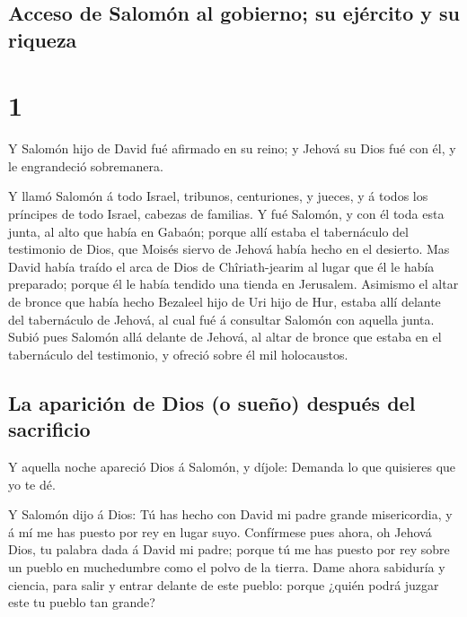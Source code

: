 \hypertarget{acceso-de-salomuxf3n-al-gobierno-su-ejuxe9rcito-y-su-riqueza}{%
\subsection{Acceso de Salomón al gobierno; su ejército y su
riqueza}\label{acceso-de-salomuxf3n-al-gobierno-su-ejuxe9rcito-y-su-riqueza}}

\hypertarget{section}{%
\section{1}\label{section}}

 Y Salomón hijo de David fué afirmado en su reino; y
Jehová su Dios fué con él, y le engrandeció sobremanera.

 Y llamó Salomón á todo Israel, tribunos, centuriones, y
jueces, y á todos los príncipes de todo Israel, cabezas de familias.
 Y fué Salomón, y con él toda esta junta, al alto que
había en Gabaón; porque allí estaba el tabernáculo del testimonio de
Dios, que Moisés siervo de Jehová había hecho en el desierto.
 Mas David había traído el arca de Dios de Chîriath-jearim
al lugar que él le había preparado; porque él le había tendido una
tienda en Jerusalem.  Asimismo el altar de bronce que
había hecho Bezaleel hijo de Uri hijo de Hur, estaba allí delante del
tabernáculo de Jehová, al cual fué á consultar Salomón con aquella
junta.  Subió pues Salomón allá delante de Jehová, al
altar de bronce que estaba en el tabernáculo del testimonio, y ofreció
sobre él mil holocaustos.

\hypertarget{la-apariciuxf3n-de-dios-o-sueuxf1o-despuuxe9s-del-sacrificio}{%
\subsection{La aparición de Dios (o sueño) después del
sacrificio}\label{la-apariciuxf3n-de-dios-o-sueuxf1o-despuuxe9s-del-sacrificio}}

 Y aquella noche apareció Dios á Salomón, y díjole:
Demanda lo que quisieres que yo te dé.

 Y Salomón dijo á Dios: Tú has hecho con David mi padre
grande misericordia, y á mí me has puesto por rey en lugar suyo.
 Confírmese pues ahora, oh Jehová Dios, tu palabra dada á
David mi padre; porque tú me has puesto por rey sobre un pueblo en
muchedumbre como el polvo de la tierra.  Dame ahora
sabiduría y ciencia, para salir y entrar delante de este pueblo: porque
¿quién podrá juzgar este tu pueblo tan grande?

